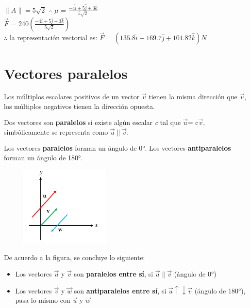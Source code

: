 \documentclass[letterpaper,12pt]{article}
\begin{document}
\begin{sloppypar}
\begin{center}
    $\|A\| = 5\sqrt{2}$ $\therefore$ $\displaystyle \mu$ = $\displaystyle \frac{-4\hat{i}+5\hat{j}+ 3\hat{k}}{5\sqrt{2}}$
    \vspace{0.3cm}\\
    $\vec{F}$ = 240$\displaystyle (\frac{-4\hat{i}+5\hat{j}+ 3\hat{k}}{5\sqrt{2}})$
    \vspace{0.3cm}\\
    $\therefore$ la representación vectorial es: $\vec{F}$ = $(135.8\hat{i}+169.7\hat{j}+101.82\hat{k})N$
\end{center}

\section{Vectores paralelos}
\noindent Los múltiplos escalares positivos de un vector $\vec{v}$ tienen la misma dirección que $\vec{v}$, los múltiplos negativos tienen la dirección opuesta. 

\noindent Dos vectores son \textbf{paralelos} si existe algún escalar \textit{c} tal que $\vec{u}$= c$\vec{v}$, simbólicamente se representa como $\vec{u} \| \vec{v} $.

\noindent Los vectores \textbf{paralelos} forman un ángulo de 0°. Los vectores \textbf{antiparalelos} forman un ángulo de 180°.

\begin{figure}[H]
    \centering
    \includegraphics[width=0.4\textwidth]{images/vecpar.PNG}
\end{figure}
\noindent De acuerdo a la figura, se concluye lo siguiente:
\begin{itemize}
    \item Los vectores $\vec{u}$ y $\vec{v}$ son \textbf{paralelos entre sí}, si $\vec{u} \| \vec{v}$ (ángulo de 0°)
    \item Los vectores $\vec{v}$ y $\vec{w}$ son \textbf{antiparalelos entre sí}, si $\vec{u} \uparrow \downarrow  \vec{v}$ (ángulo de 180°), pasa lo mismo con $\vec{u}$ y $\vec{w}$
\end{itemize}



\end{sloppypar}
\end{document}
